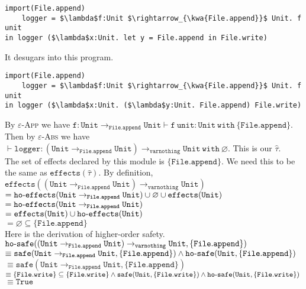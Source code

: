 \documentclass{llncs}
\newcommand{\keywadj}[1]{\mathtt{#1}}
\newcommand{\keyw}[1]{\keywadj{#1}~}
\newcommand{\kw}[1]{\keyw{ #1 }}
\newcommand{\kwa}[1]{\keywadj{ #1 }}
\newcommand{\hyphen}{\hbox{-}}
\begin{document}
\begin{lstlisting}
import(File.append)
    logger = $\lambda$f:Unit $\rightarrow_{\kwa{File.append}}$ Unit. f unit
in logger ($\lambda$x:Unit. let y = File.append in File.write)
\end{lstlisting}

\noindent
It desugars into this program.

\begin{lstlisting}
import(File.append)
    logger = $\lambda$f:Unit $\rightarrow_{\kwa{File.append}}$ Unit. f unit
in logger ($\lambda$x:Unit. ($\lambda$y:Unit. File.append) File.write)
\end{lstlisting}

\noindent
By \textsc{$\varepsilon$-App} we have $\kwa{f : Unit \rightarrow_{File.append} Unit \vdash f~unit: Unit~\kw{with} \{ File.append \}}$. Then by \textsc{$\varepsilon$-Abs} we have $\kwa{\vdash logger: (Unit \rightarrow_{File.append} Unit) \rightarrow_{varnothing} Unit~\kw{with} \varnothing }$. This is our $\hat \tau$. \\

\noindent
The set of effects declared by this module is $\kwa{\{ File.append \}}$. We need this to be the same as $\kwa{effects}(\hat \tau)$. By definition, \\

\noindent
$\kw{effects((Unit \rightarrow_{File.append} Unit) \rightarrow_{varnothing} Unit)}$\\
$\kw{= ho \hyphen effects(Unit \rightarrow_{File.append} Unit) \cup \varnothing \cup effects(Unit)}$ \\
$\kw{= ho \hyphen effects(Unit \rightarrow_{File.append} Unit)}$ \\
$\kw{= effects(Unit) \cup ho \hyphen effects(Unit)}$ \\
$\kw{= \varnothing \subseteq \{File.append\}}$ \\

\noindent
Here is the derivation of higher-order safety. \\
$\kw{ho \hyphen safe((Unit \rightarrow_{File.append} Unit) \rightarrow_{varnothing} Unit, \{File.append\})}$ \\
$\kw{\equiv safe(Unit \rightarrow_{File.append} Unit, \{File.append\}) \land ho \hyphen safe(Unit, \{File.append\})}$ \\
$\kw{\equiv safe(Unit \rightarrow_{File.append} Unit, \{File.append\})}$ \\
$\kw{\equiv \{File.write\} \subseteq \{File.write\} \land safe(Unit, \{ File.write \}) \land ho \hyphen safe(Unit , \{ File.write \})}$ \\
$\equiv \kw{True}$\\
\end{document}
